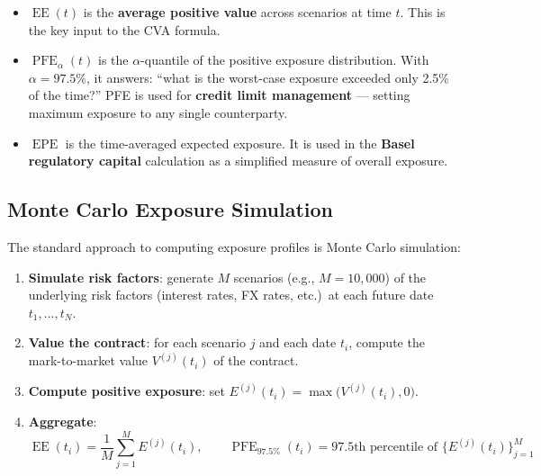 \documentclass[11pt, a4paper]{article}
\theoremstyle{definition}
\theoremstyle{plain}
\theoremstyle{remark}
\newcommand{\EE}{\operatorname{EE}}
\newcommand{\PFE}{\operatorname{PFE}}
\newcommand{\EPE}{\operatorname{EPE}}
\begin{document}
\begin{itemize}
    \item $\EE(t)$ is the \textbf{average positive value} across scenarios at time $t$.
          This is the key input to the CVA formula.
    \item $\PFE_\alpha(t)$ is the $\alpha$-quantile of the positive exposure distribution.
          With $\alpha = 97.5\%$, it answers: ``what is the worst-case exposure exceeded
          only 2.5\% of the time?''
          PFE is used for \textbf{credit limit management} --- setting maximum exposure
          to any single counterparty.
    \item $\EPE$ is the time-averaged expected exposure.
          It is used in the \textbf{Basel regulatory capital} calculation as a simplified
          measure of overall exposure.
\end{itemize}

\subsection{Monte Carlo Exposure Simulation}

The standard approach to computing exposure profiles is Monte Carlo simulation:

\begin{enumerate}
    \item \textbf{Simulate risk factors}: generate $M$ scenarios (e.g., $M = 10{,}000$)
          of the underlying risk factors (interest rates, FX rates, etc.)\ at each
          future date $t_1, \ldots, t_N$.
    \item \textbf{Value the contract}: for each scenario $j$ and each date $t_i$,
          compute the mark-to-market value $V^{(j)}(t_i)$ of the contract.
    \item \textbf{Compute positive exposure}: set
          $E^{(j)}(t_i) = \max\bigl(V^{(j)}(t_i), 0\bigr)$.
    \item \textbf{Aggregate}:
          \[
              \EE(t_i) = \frac{1}{M}\sum_{j=1}^{M} E^{(j)}(t_i), \qquad
              \PFE_{97.5\%}(t_i) = \text{97.5th percentile of } \{E^{(j)}(t_i)\}_{j=1}^{M}
          \]
\end{enumerate}
\end{document}
